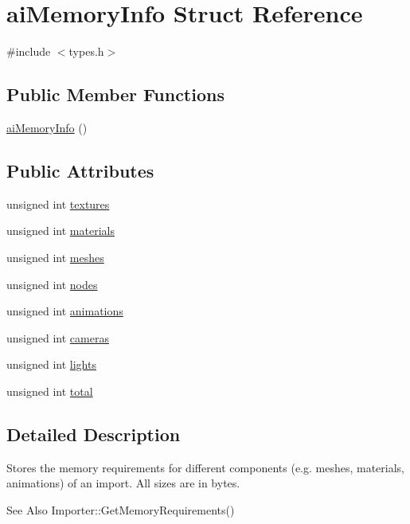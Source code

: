 \hypertarget{structai_memory_info}{\section{ai\-Memory\-Info Struct Reference}
\label{structai_memory_info}
}


{\ttfamily \#include $<$types.\-h$>$}

\subsection*{Public Member Functions}
\begin{DoxyCompactItemize}
\item 
\hyperlink{structai_memory_info_aa3e1ed9451d5742e81c4da1d76ad4b77}{ai\-Memory\-Info} ()
\end{DoxyCompactItemize}
\subsection*{Public Attributes}
\begin{DoxyCompactItemize}
\item 
unsigned int \hyperlink{structai_memory_info_a32817d13f0e280777e49769f8c46f168}{textures}
\item 
unsigned int \hyperlink{structai_memory_info_a08b2ccd0cef8dec36e47fc1beeb168f1}{materials}
\item 
unsigned int \hyperlink{structai_memory_info_ac24ed2b3c141f043765b6e34783d1e24}{meshes}
\item 
unsigned int \hyperlink{structai_memory_info_a5a084942c81a29f7bb03c9903430b033}{nodes}
\item 
unsigned int \hyperlink{structai_memory_info_af82394dc3a17a644061ed647817efa68}{animations}
\item 
unsigned int \hyperlink{structai_memory_info_a3ddd36d7eabcf989ab72cda2dd3ff015}{cameras}
\item 
unsigned int \hyperlink{structai_memory_info_afcd2ccdfab49e2fce989413a362b8d35}{lights}
\item 
unsigned int \hyperlink{structai_memory_info_a590739a4cef4876901d1cf6ff48f01b3}{total}
\end{DoxyCompactItemize}


\subsection{Detailed Description}
Stores the memory requirements for different components (e.\-g. meshes, materials, animations) of an import. All sizes are in bytes. \begin{DoxySeeAlso}{See Also}
Importer\-::\-Get\-Memory\-Requirements() 
\end{DoxySeeAlso}


